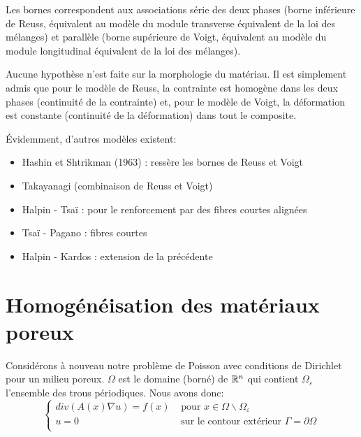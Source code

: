 Les bornes correspondent aux associations série des deux phases (borne inférieure de Reuss, 
équivalent au modèle  du module transverse équivalent de la loi des mélanges) et parallèle 
(borne supérieure de Voigt, équivalent au modèle  du module longitudinal équivalent de la loi des mélanges). 

Aucune hypothèse n'est faite sur la morphologie du matériau. 
Il est simplement admis que pour le modèle de Reuss, la contrainte est homogène dans les deux 
phases (continuité de la contrainte) et, pour le modèle de Voigt, 
la déformation est constante  (continuité de la déformation) dans tout le composite. 


\medskip
Évidemment, d'autres modèles existent:
\begin{itemize}
	\item Hashin et Shtrikman (1963) : ressère les bornes de Reuss et Voigt
	\item Takayanagi (combinaison de Reuss et Voigt)
	\item Halpin - Tsaï : pour le renforcement par des fibres courtes alignées
	\item Tsaï - Pagano : fibres courtes
	\item Halpin - Kardos : extension de la précédente
\end{itemize}













\medskip
\section{Homogénéisation des matériaux poreux}

Considérons à nouveau notre problème de Poisson avec conditions de Dirichlet pour un milieu
poreux. 
$\Omega$ est le domaine (borné) de $\mathbb R^n$ qui contient $\Omega_\varepsilon$ l'ensemble des trous 
périodiques.
Nous avons donc:
\begin{equation}
\left\{
\begin{array}{ll}
div(A(x)\nabla u) = f(x) &\text{ pour } x\in\Omega\backslash\Omega_\varepsilon\\
u=0 & \text{ sur le contour extérieur } \Gamma=\partial\Omega\\
\end{array}
\right.
\end{equation}

